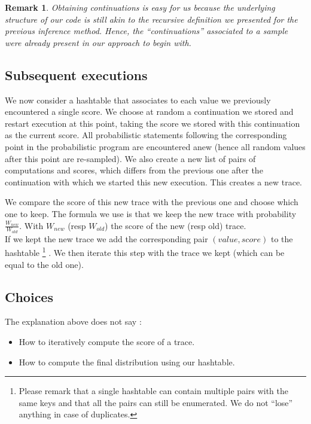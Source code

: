 \documentclass{article}
\newtheorem{remark}{Remark}
\begin{document}
	\begin{remark}
	  Obtaining continuations is easy for us because the underlying structure of our code is still akin to the recursive definition we presented for the previous inference method.
	  Hence, the ``continuations'' associated to a sample were already present in our approach to begin with.
	\end{remark}

	\subsection{Subsequent executions}

	We now consider a hashtable that associates to each value we previously encountered a single score. 
	We choose at random a continuation we stored and restart execution at this point, taking the score we stored with this continuation as the current score. 
	All probabilistic statements following the corresponding point in the probabilistic program are encountered anew (hence all random values after this point are re-sampled).
	We also create a new list of pairs of computations and scores, which differs from the previous one after the continuation with which we started this new execution.
	This creates a new trace.

	We compare the score of this new trace with the previous one and choose which one to keep.
	The formula we use is that we keep the new trace with probability $\frac{W_{new}}{W_{old}}$. 
	With $W_{new}$ (resp $W_{old}$) the score of the new (resp old) trace. \\

	If we kept the new trace we add the corresponding pair $(value, score)$ to the hashtable
	\footnote{Please remark that a single hashtable can contain multiple pairs with the same keys and that all the pairs can still be enumerated. We do not ``lose'' anything in case of duplicates.}
	.
	We then iterate this step with the trace we kept (which can be equal to the old one).

	\subsection{Choices}
	\label{subseq:choice}

	The explanation above does not say :
	\begin{itemize}
	  \item How to iteratively compute the score of a trace.
	  \item How to compute the final distribution using our hashtable.
	\end{itemize}
\end{document}
